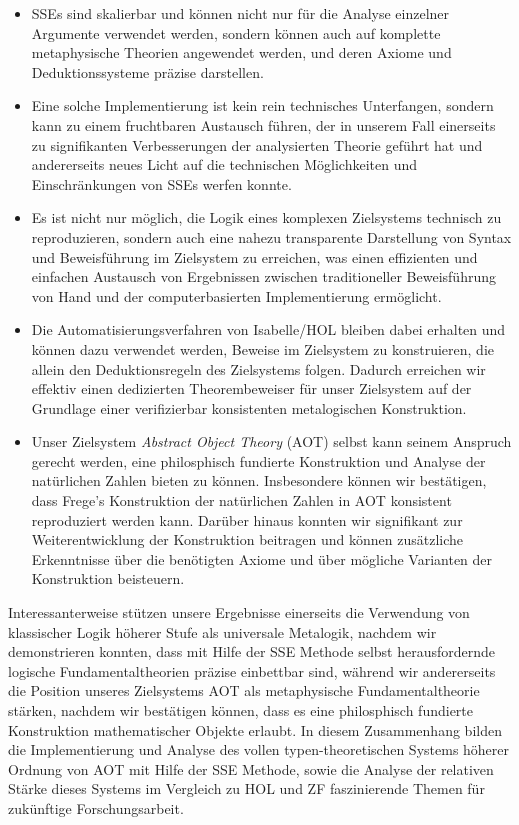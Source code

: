 \documentclass[a4paper,enabledeprecatedfontcommands,abstract=on,twoside=true]{scrreprt}
\numberwithin{TODO}{chapter}
\numberwithin{equation}{section}
\begin{document}
\begin{itemize}
\item SSEs sind skalierbar und k\"onnen nicht nur für die Analyse einzelner Argumente verwendet werden, sondern k\"onnen auch auf komplette metaphysische Theorien angewendet werden, und deren Axiome und Deduktionssysteme pr\"azise darstellen.
\item Eine solche Implementierung ist kein rein technisches Unterfangen, sondern kann zu einem fruchtbaren Austausch f\"uhren, der in unserem Fall einerseits zu signifikanten Verbesserungen der analysierten Theorie gef\"uhrt hat und andererseits neues Licht auf die technischen Möglichkeiten und Einschränkungen von SSEs werfen konnte.
\item Es ist nicht nur möglich, die Logik eines komplexen Zielsystems technisch zu reproduzieren, sondern auch eine nahezu transparente Darstellung von Syntax und Beweisf\"uhrung im Zielsystem zu erreichen, was einen effizienten und einfachen Austausch von Ergebnissen zwischen traditioneller Beweisf\"uhrung von Hand und der computerbasierten Implementierung ermöglicht.
\item Die Automatisierungsverfahren von Isabelle/HOL bleiben dabei erhalten und können dazu verwendet werden, Beweise im Zielsystem zu konstruieren, die allein den Deduktionsregeln des Zielsystems folgen. Dadurch erreichen wir effektiv einen dedizierten Theorembeweiser für unser Zielsystem auf der Grundlage einer verifizierbar konsistenten metalogischen Konstruktion.
\item Unser Zielsystem \emph{Abstract Object Theory} (AOT) selbst kann seinem Anspruch gerecht werden, eine philosphisch fundierte Konstruktion und Analyse der nat\"urlichen Zahlen bieten zu k\"onnen. Insbesondere k\"onnen wir bestätigen, dass Frege's Konstruktion der nat\"urlichen Zahlen in AOT konsistent reproduziert werden kann. Dar\"uber hinaus konnten wir signifikant zur Weiterentwicklung der Konstruktion beitragen und k\"onnen zusätzliche Erkenntnisse \"uber die ben\"otigten Axiome und \"uber m\"ogliche Varianten der Konstruktion beisteuern.
\end{itemize}

Interessanterweise stützen unsere Ergebnisse einerseits die Verwendung von klassischer Logik h\"oherer Stufe als universale Metalogik, nachdem wir demonstrieren konnten, dass mit Hilfe der SSE Methode selbst herausfordernde logische Fundamentaltheorien präzise einbettbar sind, während wir andererseits die Position unseres Zielsystems AOT als metaphysische Fundamentaltheorie st\"arken, nachdem wir best\"atigen k\"onnen, dass es eine philosphisch fundierte Konstruktion mathematischer Objekte erlaubt. In diesem Zusammenhang bilden die Implementierung und Analyse des vollen typen-theoretischen Systems h\"oherer Ordnung von AOT mit Hilfe der SSE Methode, sowie die Analyse der relativen St\"arke dieses Systems im Vergleich zu HOL und ZF faszinierende Themen f\"ur zuk\"unftige Forschungsarbeit.
\end{document}

